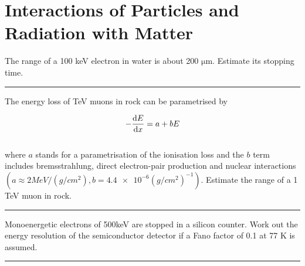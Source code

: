 
\section{Interactions of Particles and Radiation with Matter}
    
\begin{problem}{1.1}
The range of a 100 keV electron in water is about 200 $\unit{\micro\meter}$. Estimate its stopping time.
\end{problem}
\begin{solution}

\end{solution}

\noindent\rule{7in}{1.5pt}


\begin{problem}{1.2}
The energy loss of TeV muons in rock can be parametrised by

\begin{align*}
    - \frac{\mathop{}\!\mathrm{d} E}{\mathop{}\!\mathrm{d} x} = a + bE
\end{align*}\\
where $a$ stands for a parametrisation of the ionisation loss and the $b$ term includes bremsstrahlung, direct electron-pair production and nuclear interactions $\left( a\approx 2\unit{ MeV}/(\unit{g/cm^2}), b=\num{4.4e-6}(\unit{g/cm^2})^{-1} \right)$. Estimate the range of a 1 TeV muon in rock.
\end{problem}
\begin{solution}

\end{solution}

\noindent\rule{7in}{1.5pt}


\begin{problem}{1.3}
    Monoenergetic electrons of 500keV are stopped in a silicon counter. Work out the energy resolution of the semiconductor detector if a Fano factor of 0.1 at 77 K is assumed.
\end{problem}
\begin{solution}

\end{solution}

\noindent\rule{7in}{1.5pt}

